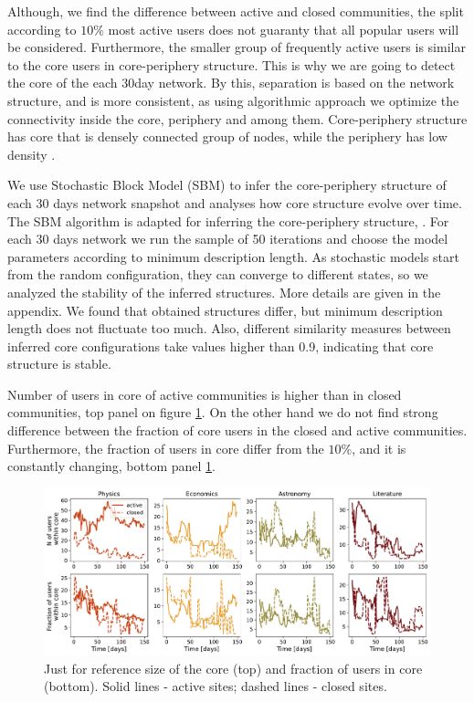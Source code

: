Although, we find the difference between active and closed communities, the split according to $10\%$  most active users does not guaranty that all popular users will be considered. Furthermore, the smaller group of frequently active users is similar to the core users in core-periphery structure. This is why we are going to detect the core of the each 30day network. By this, separation is based on the network structure, and is more consistent, as using algorithmic approach we optimize the connectivity inside the core, periphery and among them. Core-periphery structure has core that is densely connected group of nodes, while the periphery has low density \cite{fortunato2010community, gallagher2020clarified}. 

We use Stochastic Block Model (SBM) to infer the core-periphery structure of each 30 days network snapshot and analyses how core structure evolve over time.  The  SBM algorithm is adapted for inferring the core-periphery structure, \cite{gallagher2020clarified}. For each 30 days network we run the sample of 50 iterations and choose the model parameters according to minimum description length. As stochastic models start from the random configuration, they can converge to different states, so we analyzed the stability of the inferred structures. More details are given in the appendix. We found that obtained structures differ, but minimum description length does not fluctuate too much. Also, different similarity measures between inferred core configurations take values higher than 0.9, indicating that core structure is stable. 

Number of users in core of active communities is higher than in closed communities, top panel on figure \ref{fig:core_size}. On the other hand we do not find strong difference between the fraction of core users in the closed and active communities. Furthermore, the fraction of users in core differ from the $10\%$, and it is constantly changing, bottom panel \ref{fig:core_size}. 

\begin{figure}[h!]
	\centering
	\includegraphics[width=\linewidth]{figures/stackexchange/core_users.pdf}
	\caption{Just for reference size of the core (top) and fraction of users in core (bottom). Solid lines - active sites; dashed lines - closed sites.}
	\label{fig:core_size}
\end{figure}

